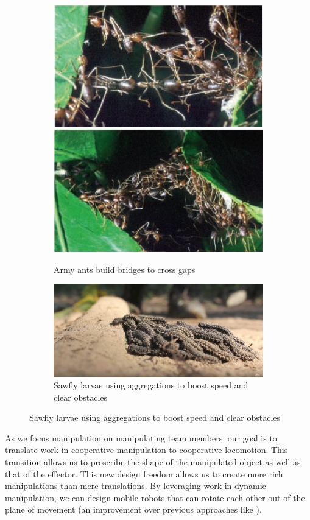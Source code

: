 \documentclass[letterpaper]{report}
\begin{document}
\begin{figure}[ht]
  \centering
  \begin{subfigure}[t]{0.8\textwidth}
    \centering
    \includegraphics[width=.5\linewidth,height=.3\textwidth]{AndersonAntBridgeL.png}%
    \includegraphics[width=.5\linewidth,height=.3\textwidth]{AndersonAntBridgeM.png}\\
    \caption{Army ants build bridges to cross gaps \cite{Anderson2002}}
  \end{subfigure}

  \begin{subfigure}[t]{0.8\textwidth}
    \centering
    \includegraphics[width=\linewidth]{SawflyLarvaeClimb.png}
    \caption{Sawfly larvae using aggregations to boost speed and clear obstacles \cite{SEDSawflyCluster}}
  \end{subfigure}
\end{figure}

As we focus manipulation on manipulating team members, our goal is to translate work in cooperative manipulation to cooperative locomotion.
This transition allows us to proscribe the shape of the manipulated object as well as that of the effector.
This new design freedom allows us to create more rich manipulations than mere translations.
By leveraging work in dynamic manipulation, we can design mobile robots that can rotate each other out of the plane of movement (an improvement over previous approaches like \cite{rus1995moving,sugar2002control}).
\end{document}
